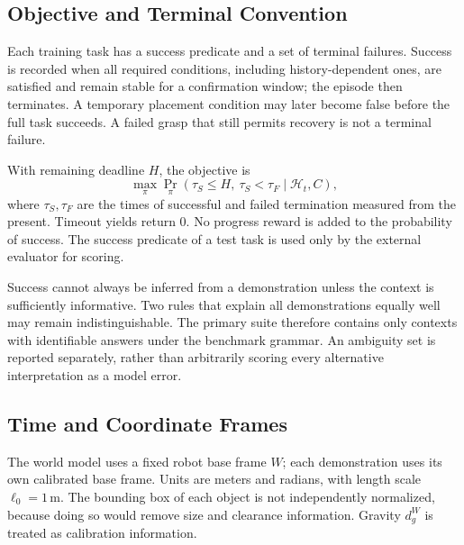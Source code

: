 \documentclass[
  10pt,
]{article}
\begin{document}
\hypertarget{mux1ee5c-tiuxeau-vuxe0-quy-ux1b0ux1edbc-terminal}{%
\subsection{Objective and Terminal Convention}\label{mux1ee5c-tiuxeau-vuxe0-quy-ux1b0ux1edbc-terminal}}

Each training task has a success predicate and a set of terminal failures. Success is recorded when all required conditions, including history-dependent ones, are satisfied and remain stable for a confirmation window; the episode then terminates. A temporary placement condition may later become false before the full task succeeds. A failed grasp that still permits recovery is not a terminal failure.

With remaining deadline \(H\), the objective is
\begin{equation}\label{eq:objective}
\max_{\pi}\Pr_\pi(\tau_S\leq H,\ \tau_S<\tau_F\mid\mathcal H_t,C),
\end{equation}
where \(\tau_S,\tau_F\) are the times of successful and failed termination measured from the present. Timeout yields return 0. No progress reward is added to the probability of success. The success predicate of a test task is used only by the external evaluator for scoring.

Success cannot always be inferred from a demonstration unless the context is sufficiently informative. Two rules that explain all demonstrations equally well may remain indistinguishable. The primary suite therefore contains only contexts with identifiable answers under the benchmark grammar. An ambiguity set is reported separately, rather than arbitrarily scoring every alternative interpretation as a model error.

\hypertarget{thux1eddi-gian-vuxe0-hux1ec7-tux1ecda-ux111ux1ed9}{%
\subsection{Time and Coordinate Frames}\label{thux1eddi-gian-vuxe0-hux1ec7-tux1ecda-ux111ux1ed9}}

The world model uses a fixed robot base frame \(W\); each demonstration uses its own calibrated base frame. Units are meters and radians, with length scale \(\ell_0=1\,\mathrm m\). The bounding box of each object is not independently normalized, because doing so would remove size and clearance information. Gravity \(d_g^W\) is treated as calibration information.
\end{document}
